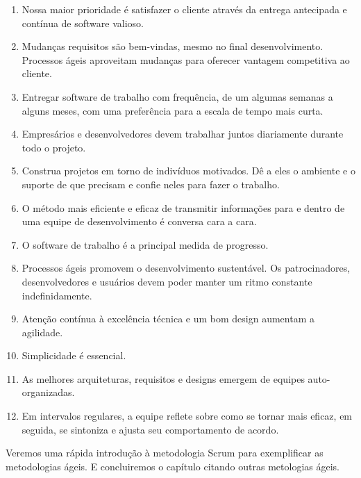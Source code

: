 \documentclass[
	11pt,				%
	openright,
	twoside,			%
	a4paper,			%
	english,			%
	french,
	brazil,				%
	sumario=tradicional
	]{abntex2}
\begin{document}
\begin{enumerate}
\item 
Nossa maior prioridade é satisfazer o cliente através da entrega antecipada e contínua de software valioso.

\item
Mudanças requisitos são bem-vindas, mesmo no final desenvolvimento. Processos ágeis aproveitam mudanças para oferecer vantagem competitiva ao cliente.

\item
Entregar software de trabalho com frequência, de um algumas semanas a alguns meses, com uma preferência para a escala de tempo mais curta.

\item
Empresários e desenvolvedores devem trabalhar juntos diariamente durante todo o projeto.

\item
Construa projetos em torno de indivíduos motivados. Dê a eles o ambiente e o suporte de que precisam e confie neles para fazer o trabalho.

\item
O método mais eficiente e eficaz de transmitir informações para e dentro de uma equipe de desenvolvimento é conversa cara a cara.

\item
O software de trabalho é a principal medida de progresso.

\item
Processos ágeis promovem o desenvolvimento sustentável. Os patrocinadores, desenvolvedores e usuários devem poder manter um ritmo constante indefinidamente.

\item
Atenção contínua à excelência técnica e um bom design aumentam a agilidade.

\item
Simplicidade é essencial.

\item
As melhores arquiteturas, requisitos e designs emergem de equipes auto-organizadas.

\item
Em intervalos regulares, a equipe reflete sobre como se tornar mais eficaz, em seguida, se sintoniza e ajusta seu comportamento de acordo.
\end{enumerate}

Veremos uma rápida introdução à metodologia Scrum para exemplificar as metodologias ágeis. E concluiremos o capítulo citando outras metologias ágeis.
\end{document}
